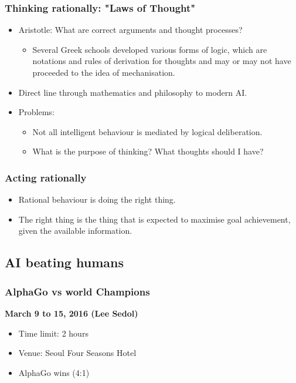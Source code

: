 \documentclass[11pt]{article}
\begin{document}
 \newpage
\subsubsection{Thinking rationally: "Laws of Thought"}
\label{sec:org6e2217a}
\begin{itemize}
\item Aristotle: What are correct arguments and thought processes?
\begin{itemize}
\item Several Greek schools developed various forms of logic, which are notations and rules of derivation for thoughts and may or may not have proceeded to the idea of mechanisation.
\end{itemize}
\item Direct line through mathematics and philosophy to modern AI.
\item Problems:
\begin{itemize}
\item Not all intelligent behaviour is mediated by logical deliberation.
\item What is the purpose of thinking? What thoughts should I have?
\end{itemize}
\end{itemize}
\subsubsection{Acting rationally}
\label{sec:orgbd587e6}
\begin{itemize}
\item Rational behaviour is doing the right thing.
\item The right thing is the thing that is expected to maximise goal achievement, given the available information.
\end{itemize}
\subsection{AI beating humans}
\label{sec:org803988f}

\subsubsection{AlphaGo vs world Champions}
\label{sec:orgf2ad889}
\textbf{March 9 to 15, 2016 (Lee Sedol)}
\begin{itemize}
\item Time limit: 2 hours
\item Venue: Seoul Four Seasons Hotel
\item AlphaGo wins (4:1)
\end{itemize}
\end{document}

